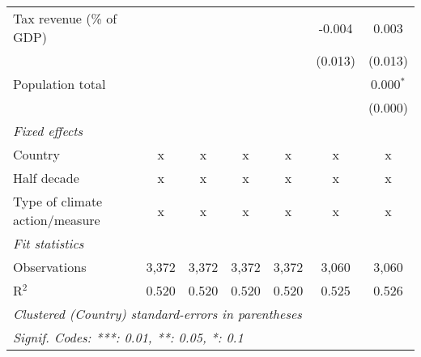 \begin{tabular}{lcccccc}
   Tax revenue (\% of GDP)                          &         &         &         &              & -0.004        & 0.003\\   
                                                    &         &         &         &              & (0.013)       & (0.013)\\   
   Population total                                 &         &         &         &              &               & 0.000$^{*}$\\   
                                                    &         &         &         &              &               & (0.000)\\   
   \emph{Fixed effects}\\
   Country                                          & x       & x       & x       & x            & x             & x\\  
   Half decade                                      & x       & x       & x       & x            & x             & x\\  
   Type of climate action/measure                   & x       & x       & x       & x            & x             & x\\  
   \midrule \emph{Fit statistics}\\
   Observations                                     & 3,372   & 3,372   & 3,372   & 3,372        & 3,060         & 3,060\\  
   R$^2$                                            & 0.520   & 0.520   & 0.520   & 0.520        & 0.525         & 0.526\\  
   \midrule
   \multicolumn{7}{l}{\emph{Clustered (Country) standard-errors in parentheses}}\\
   \multicolumn{7}{l}{\emph{Signif. Codes: ***: 0.01, **: 0.05, *: 0.1}}\\
\end{tabular}
\par\endgroup



